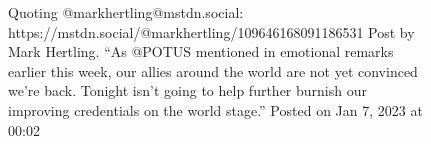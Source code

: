 \begin{figure}
\centering
{}
\caption{Quoting @markhertling@mstdn.social:
https://mstdn.social/@markhertling/109646168091186531 Post by Mark
Hertling. ``As @POTUS mentioned in emotional remarks earlier this week,
our allies around the world are not yet convinced we're back. Tonight
isn't going to help further burnish our improving credentials on the
world stage.'' Posted on Jan 7, 2023 at 00:02}
\end{figure}

